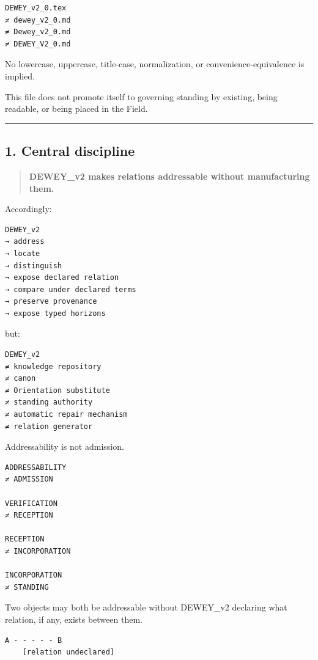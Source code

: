 \begin{verbatim}
DEWEY_v2_0.tex
≠ dewey_v2_0.md
≠ Dewey_v2_0.md
≠ DEWEY_V2_0.md
\end{verbatim}

No lowercase, uppercase, title-case, normalization, or
convenience-equivalence is implied.

This file does not promote itself to governing standing by existing,
being readable, or being placed in the Field.

\begin{center}\rule{0.5\linewidth}{0.5pt}\end{center}

\subsection{1. Central discipline}\label{central-discipline}

\begin{quote}
\textbf{DEWEY\_v2 makes relations addressable without manufacturing
them.}
\end{quote}

Accordingly:

\begin{verbatim}
DEWEY_v2
→ address
→ locate
→ distinguish
→ expose declared relation
→ compare under declared terms
→ preserve provenance
→ expose typed horizons
\end{verbatim}

but:

\begin{verbatim}
DEWEY_v2
≠ knowledge repository
≠ canon
≠ Orientation substitute
≠ standing authority
≠ automatic repair mechanism
≠ relation generator
\end{verbatim}

Addressability is not admission.

\begin{verbatim}
ADDRESSABILITY
≠ ADMISSION

VERIFICATION
≠ RECEPTION

RECEPTION
≠ INCORPORATION

INCORPORATION
≠ STANDING
\end{verbatim}

Two objects may both be addressable without DEWEY\_v2 declaring what
relation, if any, exists between them.

\begin{verbatim}
A - - - - - B
    [relation undeclared]
\end{verbatim}

